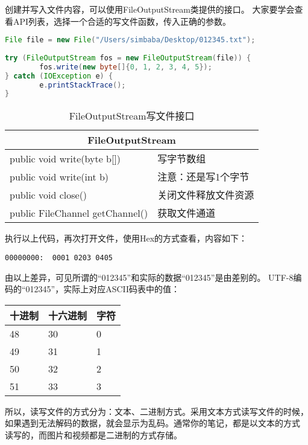 创建并写入文件内容，可以使用FileOutputStream类提供的接口。
大家要学会查看API列表，选择一个合适的写文件函数，传入正确的参数。

\begin{lstlisting}[language=Java]
File file = new File("/Users/simbaba/Desktop/012345.txt");
       
try (FileOutputStream fos = new FileOutputStream(file)) {
		fos.write(new byte[]{0, 1, 2, 3, 4, 5});
} catch (IOException e) {
		e.printStackTrace();
}
\end{lstlisting}

\begin{table}[!htbp]\centering
	\begin{tabular}{|p{7cm}|p{5.2cm}|}
	\hline
	\multicolumn{2}{|c|}{FileOutputStream}\\
	\hline
	public void write(byte b[])&写字节数组\\
	public void write(int b) &注意：还是写1个字节\\
	public void close() &关闭文件释放文件资源\\
	public FileChannel getChannel() &获取文件通道\\
	\hline
	\end{tabular}
	\caption{FileOutputStream写文件接口}
\end{table}

\noindent
执行以上代码，再次打开文件，使用Hex的方式查看，内容如下：
\begin{lstlisting}
00000000:  0001 0203 0405          
\end{lstlisting}

\noindent
由以上差异，可见所谓的“012345”和实际的数据“012345”是由差别的。
UTF-8编码的“012345”，实际上对应ASCII码表中的值：

\begin{table}[!htbp]\centering
	\begin{tabular}{|p{2cm}|p{2cm}|p{2cm}|}
	\hline
	十进制&十六进制&字符\\
	\hline
	48&30&0\\
	49&31&1\\
	50&32&2\\
	51&33&3\\
	\hline
	\end{tabular}
\end{table}

\noindent
所以，读写文件的方式分为：文本、二进制方式。采用文本方式读写文件的时候，
如果遇到无法解码的数据，就会显示为乱码。通常你的笔记，都是以文本的方式
读写的，而图片和视频都是二进制的方式存储。

